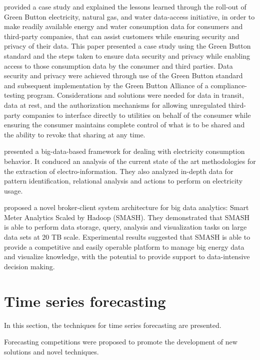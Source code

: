 \cite{Nguyen2019} provided a case study and explained the lessons learned through the roll-out of Green Button electricity, natural gas, and water data-access initiative, in order to make readily available energy and water consumption data for consumers and third-party companies, that can assist customers while ensuring security and privacy of their data.
This paper presented a case study using the Green Button standard and the steps taken to ensure data security and privacy while enabling access to those consumption data by the consumer and third parties.
Data security and privacy were achieved through use of the Green Button standard and subsequent implementation by the Green Button Alliance of a compliance-testing program.
Considerations and solutions were needed for data in transit, data at rest, and the authorization mechanisms for allowing unregulated third-party companies to interface directly to utilities on behalf of the consumer while ensuring the consumer maintains complete control of what is to be shared and the ability to revoke that sharing at any time.

\cite{8577770} presented a big-data-based framework for dealing with electricity consumption behavior.
It conduced an analysis of the current state of the art methodologies for the extraction of electro-information.
They also analyzed in-depth data for pattern identification, relational analysis and actions to perform on electricity usage.

\cite{WILCOX2019250} proposed a novel broker-client system architecture for big data analytics: Smart Meter Analytics Scaled by Hadoop (SMASH).
They demonstrated that SMASH is able to perform data storage, query, analysis and visualization tasks on large data sets at 20 TB scale.
Experimental results suggested that SMASH is able to provide a competitive and easily operable platform to manage big energy data and visualize knowledge, with the potential to provide support to data-intensive decision making.


\section{Time series forecasting}
\label{sec:timeseries}
\vspace{0.2 cm}

In this section, the techniques for time series forecasting are presented.

Forecasting competitions were proposed to promote the development of new solutions and novel techniques. 
\cite{HYNDMAN20207}
\cite{SPILIOTIS202037}

